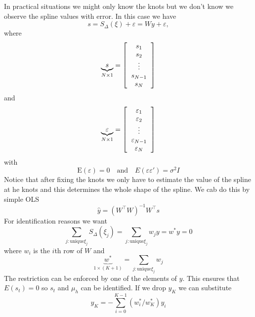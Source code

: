 \documentclass[12pt]{article}
\begin{document}
In practical situations we might only know the knots but we don't know we observe the spline values with error. In this case we have 
\begin{equation}
s=S_{\Delta}(\xi)+\varepsilon = Wy+\varepsilon,
\end{equation} 
where 
\begin{equation}
\underbrace{s}_{N\times 1}=\left[
\begin{tabular}{c}
$s_1$ \\
$s_2$ \\
$\vdots$ \\
$s_{N-1}$ \\
$s_{N}$ \\
\end{tabular} \right]
\end{equation}
and 
\begin{equation}
\underbrace{\varepsilon}_{N\times 1}=\left[
\begin{tabular}{c}
$\varepsilon_1$ \\
$\varepsilon_2$ \\
$\vdots$ \\
$\varepsilon_{N-1}$ \\
$\varepsilon_{N}$ \\
\end{tabular} \right]
\end{equation}
with
\begin{equation}
\text{E}(\varepsilon)=0 \quad \text{and} \quad E(\varepsilon \varepsilon')=\sigma^2 I
\end{equation}
Notice that after fixing the knots we only have to estimate the value of the spline at he knots and this determines the whole shape of the spline. We cab do this by simple OLS
\begin{equation}
\hat{y}=(W^{\top} W)^{-1}W^{\top}s
\end{equation}
For identification reasons we want
\begin{equation}
\sum \limits_{j : \text{unique} \xi_j} S_{\Delta}(\xi_j )=\sum \limits_{j : \text{unique} \xi_j} w_j y= w^{*}y= 0
\end{equation}
 where $w_i$ is the $i$th row of $W$ and 
 \begin{equation}
  \underbrace{w^{*}}_{1 \times (K+1)}=\sum \limits_{j : \text{unique} \xi_j} w_j
 \end{equation}
The restriction can be enforced by one of the elements of $y$. This ensures that $E(s_t)=0$ so $s_t$ and $\mu_{h}$ can be identified.  If we drop $y_K$ we can substitute 
\begin{equation}
y_K = - \sum \limits_{i=0}^{K-1} (w^{*}_{i}/w^{*}_{K})y_i
\end{equation}
\end{document}
